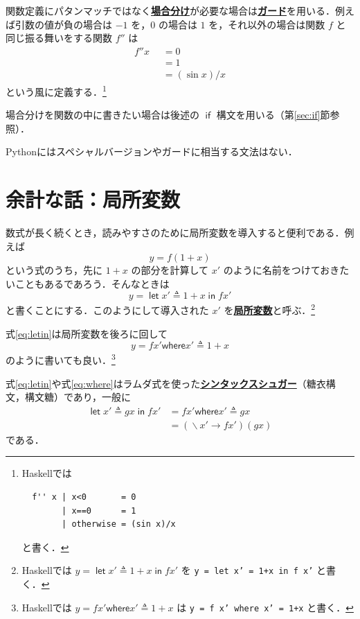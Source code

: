 \documentclass[a4paper,twocolumn]{jsbook}
\newcommand{\programminglanguage}[1]{\textsf{#1}}
\newcommand{\haskell}{\programminglanguage{Haskell}}
\newcommand{\python}{\programminglanguage{Python}}
\newcommand{\keyword}[1]{{\underline{\textbf{#1}}}}
\newcommand{\code}[1]{\texttt{#1}}
\newcommand{\mKeyword}[1]{\mathsf{#1}} %
\newcommand{\mIfKeyword}{\mKeyword{if}}
\newcommand{\mInKeyword}{\mKeyword{in}}
\newcommand{\mLetKeyword}{\mKeyword{let}}
\newcommand{\mOtherwiseKeyword}{\mKeyword{otherwise}}
\newcommand{\mWhereKeyword}{\mKeyword{where}}
\DeclareMathOperator{\mIf}{\mIfKeyword}
\DeclareMathOperator{\mInKW}{\mInKeyword} %
\DeclareMathOperator{\mLet}{\mLetKeyword} %
\DeclareMathOperator{\mOtherwise}{\mOtherwiseKeyword}
\DeclareMathOperator{\mLambda}{\backslash}
\DeclareMathOperator{\mLambdaArrow}{\rightarrow}
\DeclareMathOperator{\mLetEq}{\triangleq}
\newcommand{\mGuard}[1]{\mathop{\mid_{#1}}}
\newcommand{\mLambdaExp}[2]{\mLambda{#1}\mLambdaArrow{#2}}
\newcommand{\mLetIn}[3]{\mLet{#1\mLetEq#2}\mInKW{#3}}
\newcommand{\mWhere}[2]{\mathbin{\mWhereKeyword}#1\mLetEq#2}
\begin{document}
関数定義にパタンマッチではなく\keyword{場合分け}が必要な場合は\keyword{ガード}を用いる．例えば引数の値が負の場合は $-1$ を，$0$ の場合は $1$ を，それ以外の場合は関数 $f$ と同じ振る舞いをする関数 $f''$ は
\begin{equation}
\begin{split}
f''x&\mGuard{x<0}=0\\
&\mGuard{x\equiv 0}=1\\
&\mGuard{\mOtherwise}=(\sin x)/x
\end{split}
\end{equation}
という風に定義する．\footnote{\haskell では
\begin{verbatim}
  f'' x | x<0       = 0
        | x==0      = 1
        | otherwise = (sin x)/x
\end{verbatim}
と書く．}

場合分けを関数の中に書きたい場合は後述の $\mIf$ 構文を用いる（第\ref{sec:if}節参照）．

\python にはスペシャルバージョンやガードに相当する文法はない．

\section{余計な話：局所変数}

数式が長く続くとき，読みやすさのために局所変数を導入すると便利である．例えば
\begin{equation}
y=f(1+x)
\end{equation}
という式のうち，先に $1+x$ の部分を計算して $x'$ のように名前をつけておきたいこともあるであろう．そんなときは
\begin{equation}
\label{eq:letin}
y=\mLetIn{x'}{1+x}{fx'}
\end{equation}
と書くことにする．このようにして導入された $x'$ を\keyword{局所変数}と呼ぶ．\footnote{\haskell では $y=\mLetIn{x'}{1+x}{fx'}$ を \code{y = let x' = 1+x in f x'} と書く．}

式\eqref{eq:letin}は局所変数を後ろに回して
\begin{equation}
\label{eq:where}
y=fx'\mWhere{x'}{1+x}
\end{equation}
のように書いても良い．\footnote{\haskell では $y=fx'\mWhere{x'}{1+x}$ は \code{y = f x' where x' = 1+x} と書く．}

式\eqref{eq:letin}や式\eqref{eq:where}はラムダ式を使った\keyword{シンタックスシュガー}（糖衣構文，構文糖）であり，一般に
\begin{align}
\mLetIn{x'}{gx}{fx'}
&=fx'\mWhere{x'}{gx}\\
&=(\mLambdaExp{x'}{fx'})(gx)
\end{align}
である．
\end{document}

